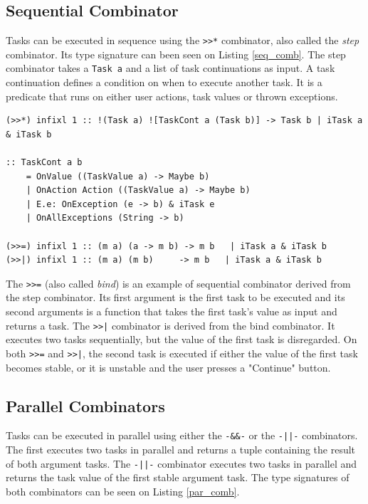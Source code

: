 \subsection{Sequential Combinator}

Tasks can be executed in sequence using the \texttt{>>*} combinator, also called the \textit{step} combinator. Its type signature can been seen on Listing \ref{seq_comb}. The step combinator takes a \texttt{Task a} and a list of task continuations as input. A task continuation defines a condition on when to execute another task. It is a predicate that runs on either user actions, task values or thrown exceptions.

\begin{lstlisting}[caption=Sequential Combinators,label=seq_comb,captionpos=b]
(>>*) infixl 1 :: !(Task a) ![TaskCont a (Task b)] -> Task b | iTask a & iTask b

:: TaskCont a b                               
	= OnValue ((TaskValue a) -> Maybe b)         
	| OnAction Action ((TaskValue a) -> Maybe b) 
	| E.e: OnException (e -> b) & iTask e        
	| OnAllExceptions (String -> b)

(>>=) infixl 1 :: (m a) (a -> m b) -> m b   | iTask a & iTask b
(>>|) infixl 1 :: (m a) (m b)     -> m b   | iTask a & iTask b
\end{lstlisting}

The \texttt{>>=} (also called \textit{bind}) is an example of sequential combinator derived from the step combinator. Its first argument is the first task to be executed and its second arguments is a function that takes the first task's value as input and returns a task. The \texttt{>>|} combinator is derived from the bind combinator. It executes two tasks sequentially, but the value of the first task is disregarded. On both \texttt{>>=} and \texttt{>>|}, the second task is executed if either the value of the first task becomes stable, or it is unstable and the user presses a "Continue" button.

\subsection{Parallel Combinators}

Tasks can be executed in parallel using either the \texttt{-\&\&-} or the \texttt{-||-} combinators. The first executes two tasks in parallel and returns a tuple containing the result of both argument tasks. The \texttt{-||-} combinator executes two tasks in parallel and returns the task value of the first stable argument task. The type signatures of both combinators can be seen on Listing \ref{par_comb}.

